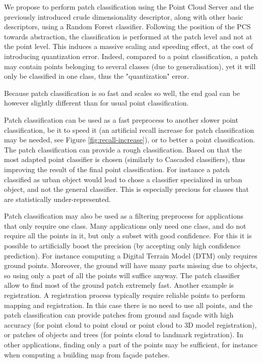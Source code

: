 		We propose to perform patch classification using the Point Cloud Server and the previously introduced crude dimensionality descriptor, along with other basic descriptors, using a Random Forest classifier.
		Following the position of the PCS towards abstraction, the classification is performed at the patch level and not at the point level. 
		This induces a massive scaling and speeding effect, at the cost of introducing quantization error.
		Indeed, compared to a point classification, a patch may contain points belonging to several classes (due to generalisation), yet it will only be classified in one class, thus the "quantization" error.
		
		Because patch classification is so fast and scales so well,
		the end goal can be however slightly different than for usual point classification.
		
		
		Patch classification can be used as a fast preprocess to another slower point classification,
		be it to speed it (an artificial recall increase for patch classification may be needed, see Figure \ref{fig:recall-increase}), or to better a point classification.
		The patch classification can provide a rough classification.
		Based on that the most adapted point classifier is chosen 
		(similarly to Cascaded classifiers),
		thus improving the result of the final point classification.
		For instance a patch classified as urban object would lead to chose a classifier specialized in urban object, and not the general classifier.
		This is especially precious for classes that are statistically under-represented.
		 
		Patch classification may also be used as a filtering preprocess for applications that only require one class. 
		Many applications only need one class, and do not require all the points in it, but only a subset with good confidence.
		For this it is possible to artificially boost the precision (by accepting only high confidence prediction).
		For instance computing a Digital Terrain Model (DTM) only requires ground points.
		Moreover, the ground will have many parts missing due to objects,
		so using only a part of all the points will suffice anyway. 
		The patch classifier allow to find most of the ground patch extremely fast.
		Another example is registration.
		A registration process typically require reliable points to perform mapping and registration.
		In this case there is no need to use all points,
		and the patch classification can provide patches from ground and façade with high accuracy
		(for point cloud to point cloud or point cloud to 3D model registration),
		or patches of objects and trees (for points cloud to landmark registration).
		In other applications, finding only a part of the points may be sufficient, for instance when computing a building map from façade patches.
		
